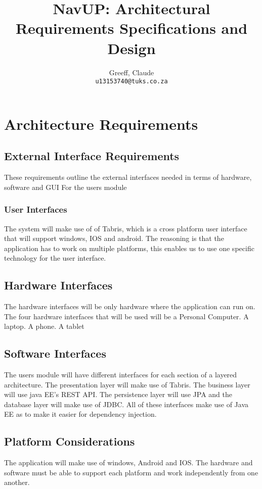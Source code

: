 \documentclass{article}
\title{NavUP: Architectural Requirements Specifications and Design}
\author{	 
	Greeff, Claude\\
	\texttt{u13153740@tuks.co.za}
	\and	
}
\begin{document}
	\maketitle
	\section{Architecture Requirements}
		\subsection{External Interface Requirements}
These requirements outline the external interfaces needed in terms of hardware, software and GUI For the users module
		 
		 \subsubsection{User Interfaces}
The system will make use of of Tabris, which is a cross platform user interface that will support windows, IOS and android. The reasoning is that the application has to work on multiple platforms, this enables us to use one specific technology for the user interface.
		\subsection{Hardware Interfaces}
		The hardware interfaces will be only hardware where the application can run on. The four hardware interfaces that will be used will be a Personal Computer. A laptop. A phone. A tablet 
		\subsection{Software Interfaces}
		The users module will have different interfaces for each section of a layered architecture. The presentation layer will make use of Tabris. The business layer will use java EE's REST API.  The persistence layer will use JPA and the database layer will make use of JDBC. All of these interfaces make use of Java EE as to make it easier for dependency injection.
		\subsection{Platform Considerations}
		The application will make use of windows, Android and IOS. The hardware and software must be able to support each platform and work independently from one another.
		


 		
	
\end{document}

